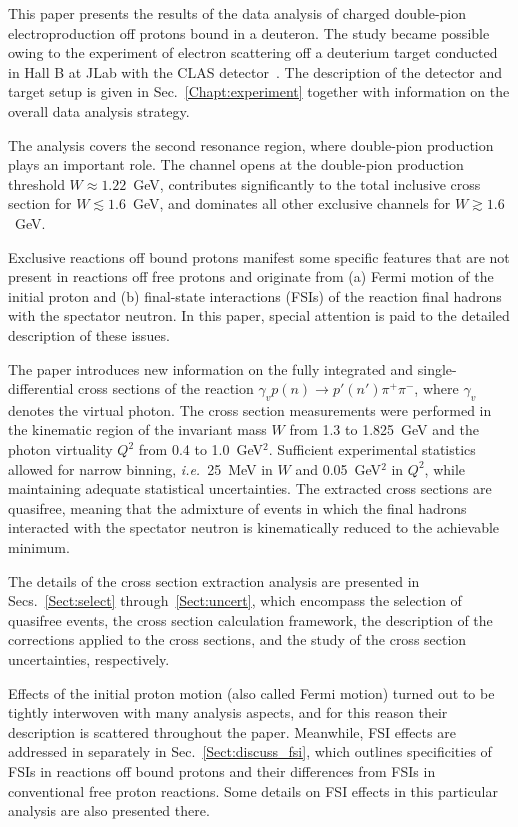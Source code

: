 \documentclass[prc,twocolumn,superscriptaddress,showpacs,amssymb,amsmath,amsfonts,aps,nofootinbib]{revtex4-1}
\begin{document}
This paper presents the results of the data analysis of charged double-pion electroproduction off protons bound in a deuteron. The study became possible owing to the experiment of electron scattering off a deuterium target conducted in Hall B at JLab with the CLAS detector~\cite{Mecking:2003zu}. The description of the detector and target setup is given in Sec.\!~\ref{Chapt:experiment} together with information on the overall data analysis strategy.  


The analysis covers the second resonance region, where double-pion production plays an important role. The channel opens at the double-pion production threshold $W \approx 1.22$~GeV, contributes significantly to the total inclusive cross section for $W \lesssim 1.6$~GeV, and dominates all other exclusive channels for $W \gtrsim 1.6$~GeV.


Exclusive reactions off bound protons manifest some specific features that are not present in reactions off free protons and originate from (a) Fermi motion of the initial proton and (b) final-state interactions (FSIs) of the reaction final hadrons with the spectator neutron. In this paper, special attention is paid to the detailed description of these issues.


The paper introduces new information on the fully integrated and single-differential cross sections of the reaction $\gamma_{v}p(n) \rightarrow p' (n')\pi^{+}\pi^{-}$, where $\gamma_{v}$ denotes the virtual photon. The cross section measurements were performed in the kinematic region of the invariant mass $W$ from 1.3 to 1.825~GeV and the photon virtuality $Q^{2}$ from 0.4 to 1.0~GeV$^2$. Sufficient experimental statistics allowed for narrow binning, {\it i.e.}~25~MeV in $W$ and 0.05~GeV$^2$ in $Q^2$, while maintaining adequate statistical uncertainties. The extracted cross sections are quasifree, meaning that the admixture of events in which the final hadrons interacted with the spectator neutron is kinematically reduced to the achievable minimum.


The details of the cross section extraction analysis are presented in Secs.~\ref{Sect:select} through~\ref{Sect:uncert}, which encompass the selection of quasifree events, the cross section calculation framework, the description of the corrections applied to the cross sections, and the study of the cross section uncertainties, respectively.


Effects of the initial proton motion (also called Fermi motion) turned out to be tightly interwoven with many analysis aspects, and for this reason their description is scattered throughout the paper. Meanwhile, FSI effects are addressed in separately in Sec.~\ref{Sect:discuss_fsi}, which outlines specificities of FSIs in reactions off bound protons and their differences from FSIs in conventional free proton reactions. Some details on FSI effects in this particular analysis are also presented there.
\end{document}
